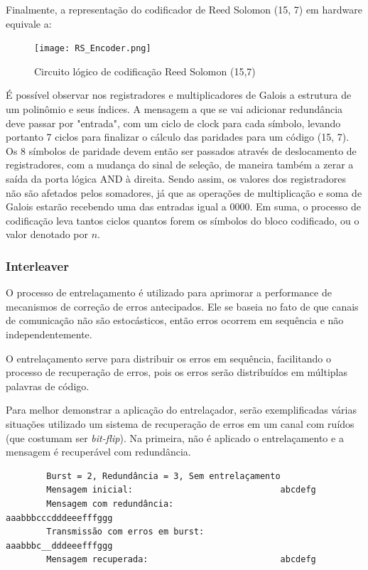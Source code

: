 	Finalmente, a representação do codificador de Reed Solomon (15, 7) em hardware equivale a:
	 
	\begin{figure}[htb]
		\caption{\label{RS_encoder_logic} Circuito lógico de codificação Reed Solomon (15,7)}
		\centering
		\texttt{[image: RS\_Encoder.png]}
	\end{figure}
	
	É possível observar nos registradores e multiplicadores de Galois a estrutura de um polinômio e seus índices. A mensagem a que se vai adicionar redundância deve passar por "entrada", com um ciclo de clock para cada símbolo, levando portanto 7 ciclos para finalizar o cálculo das paridades para um código (15, 7). Os 8 símbolos de paridade devem então ser passados através de deslocamento de registradores, com a mudança do sinal de seleção, de maneira também a zerar a saída da porta lógica AND à direita. Sendo assim, os valores dos registradores não são afetados pelos somadores, já que as operações de multiplicação e soma de Galois estarão recebendo uma das entradas igual a 0000. Em suma, o processo de codificação leva tantos ciclos quantos forem os símbolos do bloco codificado, ou o valor denotado por $n$.
	
	\cite{nasa-rs1}

	\subsubsection{Interleaver}
	
	O processo de entrelaçamento é utilizado para aprimorar a performance de mecanismos de correção de erros antecipados. Ele se baseia no fato de que canais de comunicação não são estocásticos, então erros ocorrem em sequência e não independentemente. 
	
	O entrelaçamento serve para distribuir os erros em sequência, facilitando o processo de recuperação de erros, pois os erros serão distribuídos em múltiplas palavras de código. 
	
	Para melhor demonstrar a aplicação do entrelaçador, serão exemplificadas várias situações utilizado um sistema de recuperação de erros em um canal com ruídos (que costumam ser \textit{bit-flip}). Na primeira, não é aplicado o entrelaçamento e a mensagem é recuperável com redundância.

	\begin{verbatim}
	    Burst = 2, Redundância = 3, Sem entrelaçamento
	    Mensagem inicial:                             abcdefg
	    Mensagem com redundância:                     aaabbbcccdddeeefffggg
	    Transmissão com erros em burst:               aaabbbc__dddeeefffggg
	    Mensagem recuperada:                          abcdefg
	\end{verbatim}

